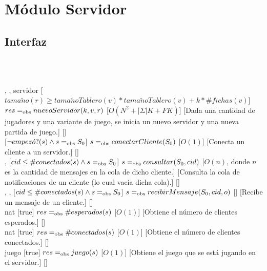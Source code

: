 \section{Módulo Servidor}
\begin{interfaz}{\subsection{Interfaz}}
  \\\\
  \usa{\falta}\par\noindent
  \begin{operaciones}
    {, , }{servidor}
    [$tama\tilde{n}o(r)\geq tama\tilde{n}oTablero(v)*tama\tilde{n}oTablero(v)+k*\#fichas(v)$]
    {$res =_{\mathrm{obs}} nuevoServidor(k,v,r)$}
    [$O(N^{2}+|\Sigma|K+FK)$]
    [Dada una cantidad de jugadores y una variante de juego, se inicia un nuevo servidor y una nueva partida de juego.]
    [\falta]\\

    \noindent{}
    {}{}
    [$\lnot empez\acute{o}?(s) \land s=_{\mathrm{obs}} S_{0}$]
    {$s=_{\mathrm{obs}} conectarCliente(S_{0})$}
    [$O(1)$]
    [Conecta un cliente a un servidor.]
    [\falta]\\

    \noindent{}
    {, }{}
    [$cid\leq \#conectados(s) \land s=_{\mathrm{obs}} S_{0}$]
    {$s=_{\mathrm{obs}} consultar(S_{0},cid)$}
    [$O(n)$, donde $n$ es la cantidad de mensajes en la cola de dicho cliente.]
    [Consulta la cola de notificaciones de un cliente (lo cual vacía dicha cola).]
    [\falta]\\

    \noindent{}
    {, , }{}
    [$cid\leq \#conectados(s) \land s=_{\mathrm{obs}} S_{0}$]
    {$s=_{\mathrm{obs}} recibirMensaje(S_{0},cid,o)$}
    [\falta]
    [Recibe un mensaje de un cliente.]
    [\falta]\\

    \noindent{}
    {}{nat}
    [true]
    {$res=_{\mathrm{obs}} \#esperados(s)$}
    [$O(1)$]
    [Obtiene el número de clientes esperados.]
    [\falta]\\

    \noindent{}
    {}{nat}
    [true]
    {$res=_{\mathrm{obs}} \#conectados(s)$}
    [$O(1)$]
    [Obtiene el número de clientes conectados.]
    [\falta]\\

    \noindent{}
    {}{juego}
    [true]
    {$res=_{\mathrm{obs}} juego(s)$}
    [$O(1)$]
    [Obtiene el juego que se está jugando en el servidor.]
    [\falta]\\
  \end{operaciones}
\end{interfaz}

